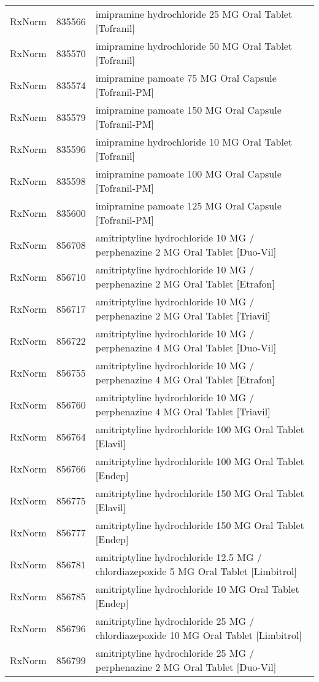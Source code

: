 \begin{longtable}{p{}p{}p{}}
  RxNorm & 835566 & imipramine hydrochloride 25 MG Oral Tablet [Tofranil] \\ 
  RxNorm & 835570 & imipramine hydrochloride 50 MG Oral Tablet [Tofranil] \\ 
  RxNorm & 835574 & imipramine pamoate 75 MG Oral Capsule [Tofranil-PM] \\ 
  RxNorm & 835579 & imipramine pamoate 150 MG Oral Capsule [Tofranil-PM] \\ 
  RxNorm & 835596 & imipramine hydrochloride 10 MG Oral Tablet [Tofranil] \\ 
  RxNorm & 835598 & imipramine pamoate 100 MG Oral Capsule [Tofranil-PM] \\ 
  RxNorm & 835600 & imipramine pamoate 125 MG Oral Capsule [Tofranil-PM] \\ 
  RxNorm & 856708 & amitriptyline hydrochloride 10 MG / perphenazine 2 MG Oral Tablet [Duo-Vil] \\ 
  RxNorm & 856710 & amitriptyline hydrochloride 10 MG / perphenazine 2 MG Oral Tablet [Etrafon] \\ 
  RxNorm & 856717 & amitriptyline hydrochloride 10 MG / perphenazine 2 MG Oral Tablet [Triavil] \\ 
  RxNorm & 856722 & amitriptyline hydrochloride 10 MG / perphenazine 4 MG Oral Tablet [Duo-Vil] \\ 
  RxNorm & 856755 & amitriptyline hydrochloride 10 MG / perphenazine 4 MG Oral Tablet [Etrafon] \\ 
  RxNorm & 856760 & amitriptyline hydrochloride 10 MG / perphenazine 4 MG Oral Tablet [Triavil] \\ 
  RxNorm & 856764 & amitriptyline hydrochloride 100 MG Oral Tablet [Elavil] \\ 
  RxNorm & 856766 & amitriptyline hydrochloride 100 MG Oral Tablet [Endep] \\ 
  RxNorm & 856775 & amitriptyline hydrochloride 150 MG Oral Tablet [Elavil] \\ 
  RxNorm & 856777 & amitriptyline hydrochloride 150 MG Oral Tablet [Endep] \\ 
  RxNorm & 856781 & amitriptyline hydrochloride 12.5 MG / chlordiazepoxide 5 MG Oral Tablet [Limbitrol] \\ 
  RxNorm & 856785 & amitriptyline hydrochloride 10 MG Oral Tablet [Endep] \\ 
  RxNorm & 856796 & amitriptyline hydrochloride 25 MG / chlordiazepoxide 10 MG Oral Tablet [Limbitrol] \\ 
  RxNorm & 856799 & amitriptyline hydrochloride 25 MG / perphenazine 2 MG Oral Tablet [Duo-Vil] \\ 

\end{longtable}
